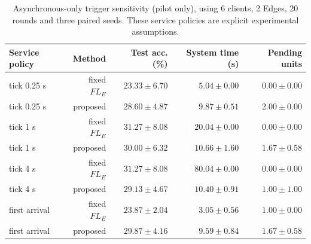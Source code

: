 \begin{table}[t]
\centering
\scriptsize
\caption{Asynchronous-only trigger sensitivity (pilot only), using 6 clients, 2 Edges, 20 rounds and three paired seeds. These service policies are explicit experimental assumptions.}
\label{tab:verified_pilot_triggers}
\begin{tabular}{lrrrr}
\toprule
Service policy & Method & Test acc. (\%) & System time (s) & Pending units \\
\midrule
tick 0.25 s & fixed $FL_E$ & $23.33\pm6.70$ & $5.04\pm0.00$ & $0.00\pm0.00$ \\
tick 0.25 s & proposed & $28.60\pm4.87$ & $9.87\pm0.51$ & $2.00\pm0.00$ \\
tick 1 s & fixed $FL_E$ & $31.27\pm8.08$ & $20.04\pm0.00$ & $0.00\pm0.00$ \\
tick 1 s & proposed & $30.00\pm6.32$ & $10.66\pm1.60$ & $1.67\pm0.58$ \\
tick 4 s & fixed $FL_E$ & $31.27\pm8.08$ & $80.04\pm0.00$ & $0.00\pm0.00$ \\
tick 4 s & proposed & $29.13\pm4.67$ & $10.40\pm0.91$ & $1.00\pm1.00$ \\
first arrival & fixed $FL_E$ & $23.87\pm2.04$ & $3.05\pm0.56$ & $1.00\pm0.00$ \\
first arrival & proposed & $29.87\pm4.16$ & $9.59\pm0.84$ & $1.67\pm0.58$ \\
\bottomrule
\end{tabular}
\end{table}
